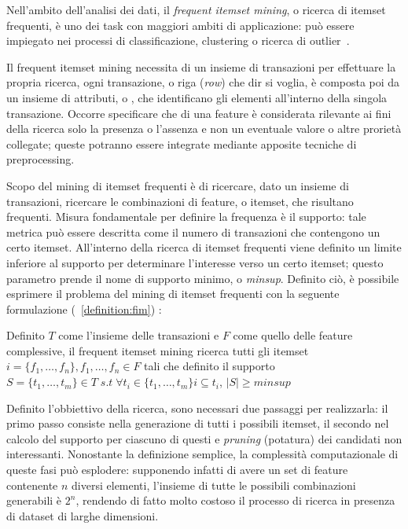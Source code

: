 Nell'ambito dell'analisi dei dati, il \textit{frequent itemset mining}, o ricerca di itemset frequenti,
è uno dei task con maggiori ambiti di applicazione: può essere impiegato nei processi di classificazione,
clustering o ricerca di outlier~\cite{article}.

Il frequent itemset mining necessita di un insieme di transazioni per effettuare la propria ricerca,
ogni transazione, o riga (\textit{row}) che dir si voglia, è composta poi da un insieme di attributi,
o , che identificano gli elementi all'interno della singola transazione.
Occorre specificare che di una feature è considerata rilevante ai fini della ricerca solo la presenza
o l'assenza e non un eventuale valore o altre prorietà collegate; queste potranno essere integrate
mediante apposite tecniche di preprocessing.

Scopo del mining di itemset frequenti è di ricercare, dato un insieme di transazioni, ricercare
le combinazioni di feature, o itemset, che risultano frequenti.
Misura fondamentale per definire la frequenza è il supporto: tale metrica può essere
descritta come il numero di transazioni che contengono un certo itemset.
All'interno della ricerca di itemset frequenti viene definito un limite inferiore al supporto
per determinare l'interesse verso un certo itemset; questo parametro prende il nome
di supporto minimo, o \textit{minsup}.
Definito ciò, è possibile esprimere il problema del mining di itemset frequenti con
la seguente formulazione (~\cref{definition:fim}) :

\begin{definition}\label{definition:fim}
  Definito \(T\) come l'insieme delle transazioni e \(F\) come quello delle feature complessive,
  il frequent itemset mining ricerca tutti gli itemset \( i = \{ f_{1}, \ldots, f_{n}\}, f_{1}, \ldots, f_{n} \in F\)
  tali che definito il supporto \( S = \{ t_{1}, \ldots, t_{m} \} \in T \; s.t \; \forall t_{i} \in \{ t_{1}, \ldots, t_{m} \}
  i \subseteq t_{i}  \), \(|S| \geq minsup\)
\end{definition}

Definito l'obbiettivo della ricerca, sono necessari due passaggi per realizzarla:
il primo passo consiste nella generazione di tutti i possibili itemset, il secondo
nel calcolo del supporto per ciascuno di questi e \textit{pruning} (potatura) dei candidati
non interessanti.
Nonostante la definizione semplice, la complessità computazionale di queste fasi può esplodere:
supponendo infatti di avere un set di feature contenente \(n\) diversi elementi, l'insieme di tutte
le possibili combinazioni generabili è \(2^n\), rendendo di fatto molto costoso il processo
di ricerca in presenza di dataset di larghe dimensioni.

